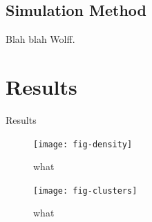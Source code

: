 \documentclass[aps,prl,reprint,groupedaddress, showpacs]{revtex4-1}
\begin{document}
\subsection{Simulation Method}

Blah blah Wolff. 


\section{Results\label{sec-results}}

Results

\begin{figure}
\texttt{[image: fig-density]}
\caption{\label{fig-density} what}
\end{figure}

\begin{figure}
\texttt{[image: fig-clusters]}
\caption{\label{fig-clusters} what}
\end{figure}



%


\end{document}
